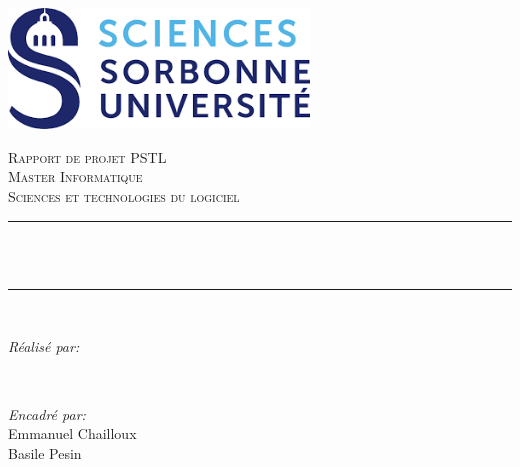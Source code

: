 \newcommand{\HRule}{\rule{\linewidth}{0.5mm}} %

\centering
\includegraphics[width=8cm]{Introduction/logo.png}\\[1cm] %
 

\center %


\textsc{\LARGE Rapport de projet PSTL}\\[1.5cm] 
\textsc{\Large Master Informatique}\\[0.5cm] 
\textsc{\large Sciences et technologies du logiciel}\\[0.5cm] 

\makeatletter
\HRule \\[0.4cm]
{ \huge \bfseries \@title}\\[0.4cm] %
\HRule \\[1.5cm]
 

\begin{minipage}{0.4\textwidth}
\begin{flushleft} \large
\emph{Réalisé par:}\\
\@author %



\end{flushleft}
\end{minipage}
~
\begin{minipage}{0.4\textwidth}
\begin{flushright} \large
\emph{Encadré par:} \\
Emmanuel Chailloux \\
Basile Pesin \\[1.2em] 
\end{flushright}
\end{minipage}\\[2cm]
\makeatother

